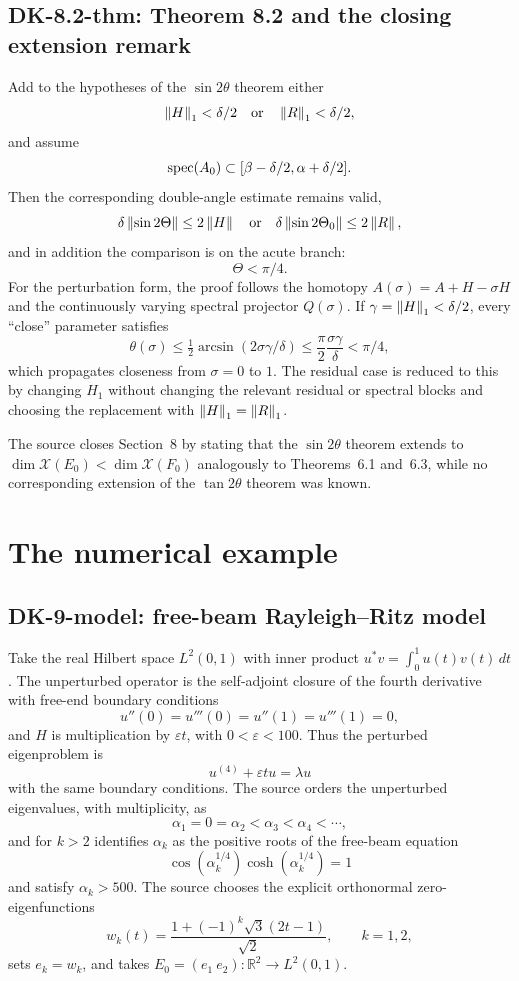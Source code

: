 \subsection*{DK-8.2-thm: Theorem 8.2 and the closing extension remark}
Add to the hypotheses of the $\sin2\theta$ theorem either
\[
 \left\lVert H\right\rVert_1<\delta/2
 \quad\text{or}\quad
 \left\lVert R\right\rVert_1<\delta/2,
\]
and assume
\[
 \operatorname{spec}(A_0)\subset[\beta-\delta/2,\alpha+\delta/2].
\]
Then the corresponding double-angle estimate remains valid,
\[
 \delta\left\lVert \sin2\Theta\right\rVert\le2\left\lVert H\right\rVert
 \quad\text{or}\quad
 \delta\left\lVert \sin2\Theta_0\right\rVert\le2\left\lVert R\right\rVert,
\]
and in addition the comparison is on the acute branch:
\[
 \boxed{\Theta<\pi/4.}
\]
For the perturbation form, the proof follows the homotopy $A(\sigma)=A+H-\sigma H$ and the continuously varying spectral projector $Q(\sigma)$.  If $\gamma=\left\lVert H\right\rVert_1<\delta/2$, every ``close'' parameter satisfies
\[
 \theta(\sigma)
 \le\tfrac12\arcsin(2\sigma\gamma/\delta)
 \le\frac{\pi}{2}\frac{\sigma\gamma}{\delta}
 <\pi/4,
\]
which propagates closeness from $\sigma=0$ to $1$.  The residual case is reduced to this by changing $H_1$ without changing the relevant residual or spectral blocks and choosing the replacement with $\left\lVert H\right\rVert_1=\left\lVert R\right\rVert_1$.

The source closes Section~8 by stating that the $\sin2\theta$ theorem extends to $\dim\mathcal X(E_0)<\dim\mathcal X(F_0)$ analogously to Theorems~6.1 and~6.3, while no corresponding extension of the $\tan2\theta$ theorem was known.

\section{The numerical example}

\subsection*{DK-9-model: free-beam Rayleigh--Ritz model}
Take the real Hilbert space $L^2(0,1)$ with inner product $u^*v=\int_0^1u(t)v(t)\,dt$.  The unperturbed operator is the self-adjoint closure of the fourth derivative with free-end boundary conditions
\[
 u''(0)=u'''(0)=u''(1)=u'''(1)=0,
\]
and $H$ is multiplication by $\varepsilon t$, with $0<\varepsilon<100$.  Thus the perturbed eigenproblem is
\[
 u^{(4)}+\varepsilon t u=\lambda u
\]
with the same boundary conditions.  The source orders the unperturbed eigenvalues, with multiplicity, as
\[
 \alpha_1=0=\alpha_2<\alpha_3<\alpha_4<\cdots,
\]
and for $k>2$ identifies $\alpha_k$ as the positive roots of the free-beam equation
\[
 \cos(\alpha_k^{1/4})\cosh(\alpha_k^{1/4})=1
\]
and satisfy $\alpha_k>500$.  The source chooses the explicit orthonormal zero-eigenfunctions
\[
 w_k(t)=\frac{1+(-1)^k\sqrt3(2t-1)}{\sqrt2},
 \qquad k=1,2,
\]
sets $e_k=w_k$, and takes $E_0=(e_1\ e_2):\mathbb R^2\to L^2(0,1)$.

